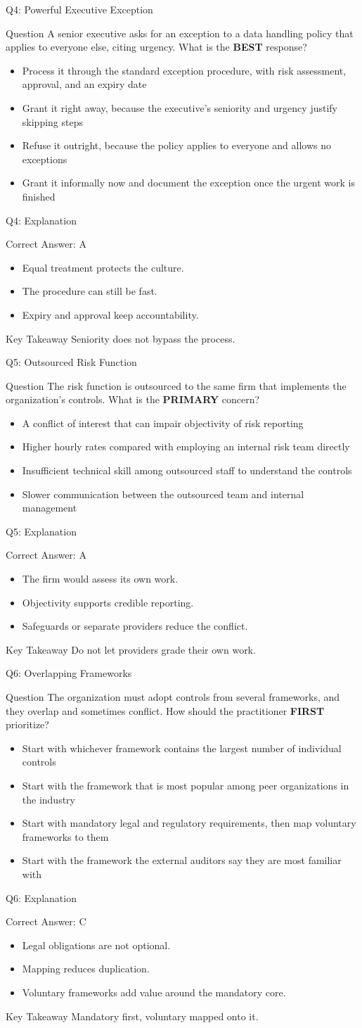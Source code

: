 \documentclass[aspectratio=169]{beamer}
\newcommand{\hq}[7]{%
	\begin{frame}{Q#1: #2}
		\begin{block}{Question}
			#3
		\end{block}
		\begin{itemize}
			#4
		\end{itemize}
	\end{frame}
	\begin{frame}{Q#1: Explanation}
		\begin{block}{Correct Answer: #5}
			\begin{itemize}
				#6
			\end{itemize}
		\end{block}
		\begin{alertblock}{Key Takeaway}
			#7
		\end{alertblock}
	\end{frame}
}
\begin{document}
	\hq{4}{Powerful Executive Exception}
	{A senior executive asks for an exception to a data handling policy that applies to everyone else, citing urgency. What is the \textbf{BEST} response?}
	{\item[\textbf{(A)}] Process it through the standard exception procedure, with risk assessment, approval, and an expiry date
		\item[\textbf{(B)}] Grant it right away, because the executive's seniority and urgency justify skipping steps
		\item[\textbf{(C)}] Refuse it outright, because the policy applies to everyone and allows no exceptions
		\item[\textbf{(D)}] Grant it informally now and document the exception once the urgent work is finished}
	{A}
	{\item Equal treatment protects the culture.
		\item The procedure can still be fast.
		\item Expiry and approval keep accountability.}
	{Seniority does not bypass the process.}

	\hq{5}{Outsourced Risk Function}
	{The risk function is outsourced to the same firm that implements the organization's controls. What is the \textbf{PRIMARY} concern?}
	{\item[\textbf{(A)}] A conflict of interest that can impair objectivity of risk reporting
		\item[\textbf{(B)}] Higher hourly rates compared with employing an internal risk team directly
		\item[\textbf{(C)}] Insufficient technical skill among outsourced staff to understand the controls
		\item[\textbf{(D)}] Slower communication between the outsourced team and internal management}
	{A}
	{\item The firm would assess its own work.
		\item Objectivity supports credible reporting.
		\item Safeguards or separate providers reduce the conflict.}
	{Do not let providers grade their own work.}

	\hq{6}{Overlapping Frameworks}
	{The organization must adopt controls from several frameworks, and they overlap and sometimes conflict. How should the practitioner \textbf{FIRST} prioritize?}
	{\item[\textbf{(A)}] Start with whichever framework contains the largest number of individual controls
		\item[\textbf{(B)}] Start with the framework that is most popular among peer organizations in the industry
		\item[\textbf{(C)}] Start with mandatory legal and regulatory requirements, then map voluntary frameworks to them
		\item[\textbf{(D)}] Start with the framework the external auditors say they are most familiar with}
	{C}
	{\item Legal obligations are not optional.
		\item Mapping reduces duplication.
		\item Voluntary frameworks add value around the mandatory core.}
	{Mandatory first, voluntary mapped onto it.}
\end{document}
